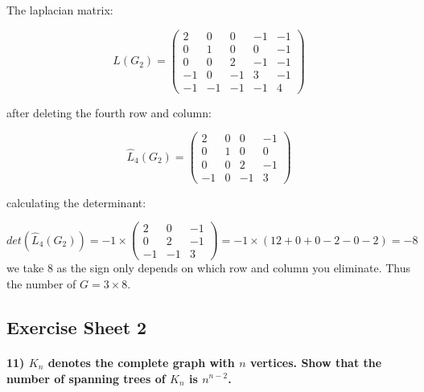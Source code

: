 \documentclass[
]{article}
\begin{document}
\begin{itemize}
  The laplacian matrix:

  \[L(G_2) = \begin{pmatrix}
    2 & 0 & 0 & -1 & -1 \\
    0 & 1 & 0 & 0 & -1  \\
    0 & 0 & 2 & -1 & -1 \\
    -1 & 0 & -1 & 3 & -1 \\
    -1 & -1 & -1 & -1 & 4
    \end{pmatrix}\]

  after deleting the fourth row and column:

  \[\hat L_4(G_2) = \begin{pmatrix}
    2 & 0 & 0 & -1 \\
    0 & 1 & 0 & 0  \\
    0 & 0 & 2 & -1 \\
    -1 & 0 & -1 & 3 
    \end{pmatrix}\]

  calculating the determinant:

  \[ 
    det(\hat L_4(G_2)) = -1 \times \begin{pmatrix}
    2 & 0 & -1 \\
    0 & 2 & -1 \\
    -1 & -1 & 3
    \end{pmatrix} 
    = -1 \times (12 + 0 + 0 - 2 - 0 - 2) = -8
    \] we take \(8\) as the sign only depends on which row and column
  you eliminate. Thus the number of \(G = 3 \times 8\).
\end{itemize}

\hypertarget{exercise-sheet-2}{%
\subsection{Exercise Sheet 2}\label{exercise-sheet-2}}

\hypertarget{k_n-denotes-the-complete-graph-with-n-vertices.-show-that-the-number-of-spanning-trees-of-k_n-is-nn-2.}{%
\paragraph{\texorpdfstring{11) \(K_n\) denotes the complete graph with
\(n\) vertices. Show that the number of spanning trees of \(K_n\) is
\(n^{n-2}\).}{11) K\_n denotes the complete graph with n vertices. Show that the number of spanning trees of K\_n is n\^{}\{n-2\}.}}\label{k_n-denotes-the-complete-graph-with-n-vertices.-show-that-the-number-of-spanning-trees-of-k_n-is-nn-2.}}
\end{document}
